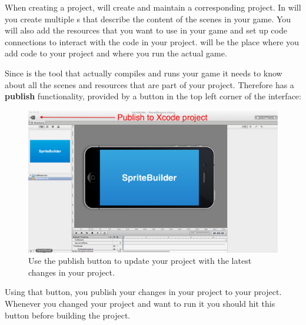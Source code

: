 When creating a \SB{} project, \SB{} will create and maintain a corresponding
\xcode{} project. In \SB{} will you create multiple \ccbfile{}s that describe
the content of the scenes in your game. You will also add the resources that
you want to use in your game and set up code connections to interact with the
code in your \xcode{} project. \xcode{} will be the place where you add code to
your project and where you run the actual game.

Since \xcode{} is the tool that actually compiles and runs your game it needs
to know about all the scenes and resources that are part of your \SB{} project.
Therefore \SB{} has a \textbf{publish} functionality, provided by
a button in the top left corner of the interface:
\begin{figure}[H]
		\centering
		\includegraphics[width=0.9\linewidth]{images/spritebuilder/spritebuilder_publish_button.png}
		\caption{Use the publish button to update your \xcode{} project with the
		latest changes in your \SB{} project.}
\end{figure}
Using that button, you publish your changes in your
\SB{} project to your \xcode{} project. Whenever you changed your \SB{}
project and want to run it you should hit this button before building the \xcode{}
project.

